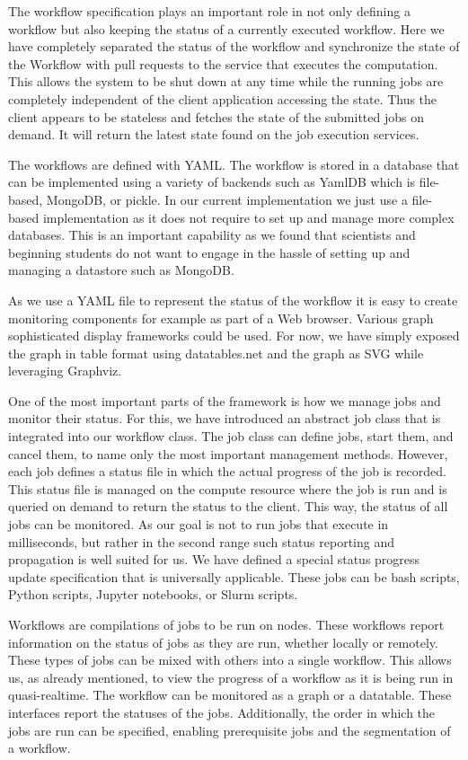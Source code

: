 The workflow specification plays an important role in not only defining
a workflow but also keeping the status of a currently executed
workflow. Here we have completely separated the status of the workflow
and synchronize the state of the Workflow with pull requests to the
service that executes the computation. This allows the system to be
shut down at any time while the running jobs are completely
independent of the client application accessing the state. Thus the
client appears to be stateless and fetches the state of the submitted
jobs on demand. It will return the latest state found on the job
execution services.

The workflows are defined with YAML. The workflow is stored in a
database that can be implemented using a variety of backends such as
YamlDB which is file-based, MongoDB, or pickle. In our current
implementation we just use a file-based implementation as it does not
require to set up and manage more complex databases. This is an
important capability as we found that scientists and beginning
students do not want to engage in the hassle of setting up and
managing a datastore such as MongoDB.

As we use a YAML file to represent the status of the workflow it is
easy to create monitoring components for example as part of a Web
browser. Various graph sophisticated display frameworks could be
used. For now, we have simply exposed the graph in table format using
datatables.net and the graph as SVG while leveraging Graphviz.

One of the most important parts of the framework is how we manage jobs
and monitor their status. For this, we have introduced an abstract job
class that is integrated into our workflow class. The job class can define jobs, start them, and cancel them, to name only the
most important management methods. However, each job defines a status
file in which the actual progress of the job is recorded. This status
file is managed on the compute resource where the job is run and is
queried on demand to return the status to the client. This way, the
status of all jobs can be monitored. As our goal is not to run jobs
that execute in milliseconds, but rather in the second range such
status reporting and propagation is well suited for us. We have
defined a special status progress update specification that is
universally applicable. These jobs can be bash scripts, Python scripts,
Jupyter notebooks, or Slurm scripts.

Workflows are compilations of jobs to be run on nodes. These workflows
report information on the status of jobs as they are run, whether
locally or remotely.  These types of jobs can be mixed
with others into a single workflow. This allows us, as already mentioned, 
to view the progress of a workflow as it is being run in quasi-realtime.
The workflow can be monitored as a graph or a datatable. These interfaces
report the statuses of the jobs. Additionally, the order in which the jobs
are run can be specified, enabling prerequisite jobs and the segmentation of a
workflow.

